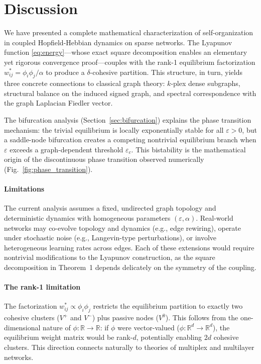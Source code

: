 \documentclass[3p]{elsarticle}
\newcommand{\R}{\mathbb{R}}
\begin{document}
\section{Discussion}

We have presented a complete mathematical characterization of self-organization in coupled Hopfield-Hebbian dynamics on sparse networks. The Lyapunov function \eqref{eq:energy}---whose exact square decomposition enables an elementary yet rigorous convergence proof---couples with the rank-1 equilibrium factorization $w_{ij}^* = \phi_i\phi_j/\alpha$ to produce a $\delta$-cohesive partition. This structure, in turn, yields three concrete connections to classical graph theory: $k$-plex dense subgraphs, structural balance on the induced signed graph, and spectral correspondence with the graph Laplacian Fiedler vector.

The bifurcation analysis (Section~\ref{sec:bifurcation}) explains the phase transition mechanism: the trivial equilibrium is locally exponentially stable for all $\varepsilon>0$, but a saddle-node bifurcation creates a competing nontrivial equilibrium branch when $\varepsilon$ exceeds a graph-dependent threshold $\varepsilon_c$. This bistability is the mathematical origin of the discontinuous phase transition observed numerically (Fig.~\ref{fig:phase_transition}).

\paragraph{Limitations}
The current analysis assumes a fixed, undirected graph topology and deterministic dynamics with homogeneous parameters $(\varepsilon,\alpha)$. Real-world networks may co-evolve topology and dynamics (e.g., edge rewiring), operate under stochastic noise (e.g., Langevin-type perturbations), or involve heterogeneous learning rates across edges. Each of these extensions would require nontrivial modifications to the Lyapunov construction, as the square decomposition in Theorem~1 depends delicately on the symmetry of the coupling.

\paragraph{The rank-1 limitation}
The factorization $w_{ij}^* \propto \phi_i\phi_j$ restricts the equilibrium partition to exactly two cohesive clusters ($V^+$ and $V^-$) plus passive nodes ($V^0$). This follows from the one-dimensional nature of $\phi:\R\to\R$: if $\phi$ were vector-valued ($\phi:\R^d\to\R^d$), the equilibrium weight matrix would be rank-$d$, potentially enabling $2d$ cohesive clusters. This direction connects naturally to theories of multiplex and multilayer networks.
\end{document}
